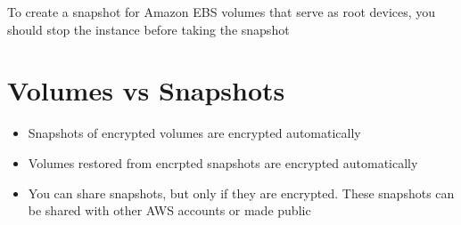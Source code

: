 \documentclass{article}
\begin{document}
To create a snapshot for Amazon EBS volumes that serve as root devices, you should stop the instance before taking the snapshot

\section{Volumes vs Snapshots}
\begin{itemize}
\item
Snapshots of encrypted volumes are encrypted automatically

\item
Volumes restored from encrpted snapshots are encrypted automatically

\item
You can share snapshots, but only if they are encrypted. These snapshots can be shared with other AWS accounts or made public

\end{itemize}
\end{document}
